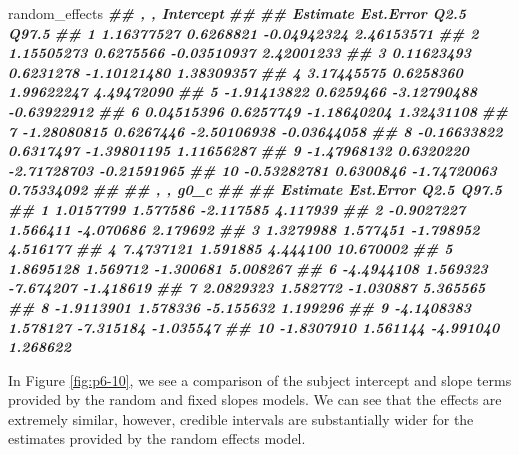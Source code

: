 \documentclass[
]{book}
\newenvironment{Shaded}{\begin{snugshade}}{\end{snugshade}}
\newcommand{\DocumentationTok}[1]{\textcolor[rgb]{0.56,0.35,0.01}{\textbf{\textit{#1}}}}
\newcommand{\NormalTok}[1]{#1}
\begin{document}
\begin{Shaded}
\begin{Highlighting}[]
\NormalTok{random\_effects}
\DocumentationTok{\#\# , , Intercept}
\DocumentationTok{\#\# }
\DocumentationTok{\#\#       Estimate Est.Error        Q2.5       Q97.5}
\DocumentationTok{\#\# 1   1.16377527 0.6268821 {-}0.04942324  2.46153571}
\DocumentationTok{\#\# 2   1.15505273 0.6275566 {-}0.03510937  2.42001233}
\DocumentationTok{\#\# 3   0.11623493 0.6231278 {-}1.10121480  1.38309357}
\DocumentationTok{\#\# 4   3.17445575 0.6258360  1.99622247  4.49472090}
\DocumentationTok{\#\# 5  {-}1.91413822 0.6259466 {-}3.12790488 {-}0.63922912}
\DocumentationTok{\#\# 6   0.04515396 0.6257749 {-}1.18640204  1.32431108}
\DocumentationTok{\#\# 7  {-}1.28080815 0.6267446 {-}2.50106938 {-}0.03644058}
\DocumentationTok{\#\# 8  {-}0.16633822 0.6317497 {-}1.39801195  1.11656287}
\DocumentationTok{\#\# 9  {-}1.47968132 0.6320220 {-}2.71728703 {-}0.21591965}
\DocumentationTok{\#\# 10 {-}0.53282781 0.6300846 {-}1.74720063  0.75334092}
\DocumentationTok{\#\# }
\DocumentationTok{\#\# , , g0\_c}
\DocumentationTok{\#\# }
\DocumentationTok{\#\#      Estimate Est.Error      Q2.5     Q97.5}
\DocumentationTok{\#\# 1   1.0157799  1.577586 {-}2.117585  4.117939}
\DocumentationTok{\#\# 2  {-}0.9027227  1.566411 {-}4.070686  2.179692}
\DocumentationTok{\#\# 3   1.3279988  1.577451 {-}1.798952  4.516177}
\DocumentationTok{\#\# 4   7.4737121  1.591885  4.444100 10.670002}
\DocumentationTok{\#\# 5   1.8695128  1.569712 {-}1.300681  5.008267}
\DocumentationTok{\#\# 6  {-}4.4944108  1.569323 {-}7.674207 {-}1.418619}
\DocumentationTok{\#\# 7   2.0829323  1.582772 {-}1.030887  5.365565}
\DocumentationTok{\#\# 8  {-}1.9113901  1.578336 {-}5.155632  1.199296}
\DocumentationTok{\#\# 9  {-}4.1408383  1.578127 {-}7.315184 {-}1.035547}
\DocumentationTok{\#\# 10 {-}1.8307910  1.561144 {-}4.991040  1.268622}
\end{Highlighting}
\end{Shaded}

In Figure \ref{fig:p6-10}, we see a comparison of the subject intercept and slope terms provided by the random and fixed slopes models. We can see that the effects are extremely similar, however, credible intervals are substantially wider for the estimates provided by the random effects model.
\end{document}
